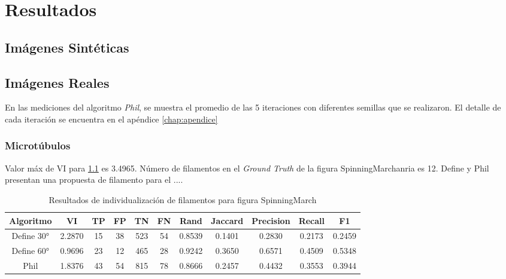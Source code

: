 \chapter{Resultados}
\label{chap:res}

\section{Im\'agenes Sint\'eticas}

\section{Im\'agenes Reales}


En las mediciones del algoritmo {\it Phil}, se muestra el promedio de las 5 iteraciones con diferentes semillas que se realizaron. El detalle de cada iteraci\'on se encuentra en el ap\'endice \ref{chap:apendice}

\subsection{Microt\'ubulos}


Valor m\'ax de VI para \ref{tab:SpinningMarchantiaResults1} es 3.4965.
N\'umero de filamentos en el {\it Ground Truth} de la figura SpinningMarchanria es 12.
Define y Phil presentan una propuesta de filamento para el ....

\begin{table}[h]
    \centering
    \begin{tabular}{|c|c|c|c|c|c|c|c|c|c|c|}
    \hline
        Algoritmo & VI & TP & FP &TN &FN & Rand	& Jaccard &	Precision &	Recall &	F1 \\ \hline
        Define 30° & 2.2870  & 15 & 38 & 523 & 54 & 0.8539 & 0.1401 & 0.2830 & 0.2173 & 0.2459\\
        Define 60° & 0.9696 & 23 & 12 & 465 & 28 & 0.9242 & 0.3650 & 0.6571 & 0.4509  & 0.5348 \\ 
        Phil & 1.8376 & 43 & 54 & 815 & 78 & 0.8666 & 0.2457 & 0.4432 & 0.3553 & 0.3944 \\
        \hline
    \end{tabular}
    \caption{Resultados de individualizaci\'on de filamentos para figura SpinningMarch}
    \label{tab:SpinningMarchantiaResults1}
\end{table}

